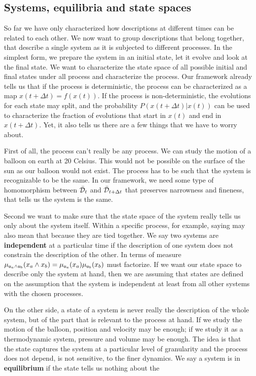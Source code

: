 \documentclass[letterpaper]{article}
\begin{document}
\subsection{Systems, equilibria and state spaces}

So far we have only characterized how descriptions at different times can be related to each other. We now want to group descriptions that belong together, that describe a single system as it is subjected to different processes. In the simplest form, we prepare the system in an initial state, let it evolve and look at the final state. We want to characterize the state space of all possible initial and final states under all process and characterize the process. Our framework already tells us that if the process is deterministic, the process can be characterized as a map $x(t+\Delta t) = f(x(t))$. If the process is non-deterministic, the evolutions for each state may split, and the probability $P(x(t + \Delta t) | x(t))$ can be used to characterize the fraction of evolutions that start in $x(t)$ and end in $x(t+\Delta t)$. Yet, it also tells us there are a few things that we have to worry about.

First of all, the process can't really be any process. We can study the motion of a balloon on earth at 20 Celsius. This would not be possible on the surface of the sun as our balloon would not exist. The process has to be such that the system is recognizable to be the same. In our framework, we need some type of homomorphism between $\tdomain_t$ and $\tdomain_{t + \Delta t}$ that preserves narrowness and fineness, that tells us the system is the same.

Second we want to make sure that the state space of the system really tells us only about the system itself. Within a specific process, for example, saying  may also mean that  because they are tied together. We say two systems are \textbf{independent} at a particular time if the description of one system does not constrain the description of the other. In terms of measure $\mu_{\stmt[u]_a \AND \stmt[u]_b}(x_a \AND x_b) = \mu_{\stmt[u]_a}(x_a) \mu_{\stmt[u]_b}(x_b)$ must factorize. If we want our state space to describe only the system at hand, then we are assuming that states are defined on the assumption that the system is independent at least from all other systems with the chosen processes.

On the other side, a state of a system is never really the description of the whole system, but of the part that is relevant to the process at hand. If we study the motion of the balloon, position and velocity may be enough; if we study it as a thermodynamic system, pressure and volume may be enough. The idea is that the state captures the system at a particular level of granularity and the process does not depend, is not sensitive, to the finer dynamics. We say a system is in \textbf{equilibrium} if the state tells us nothing about the 
\end{document}
